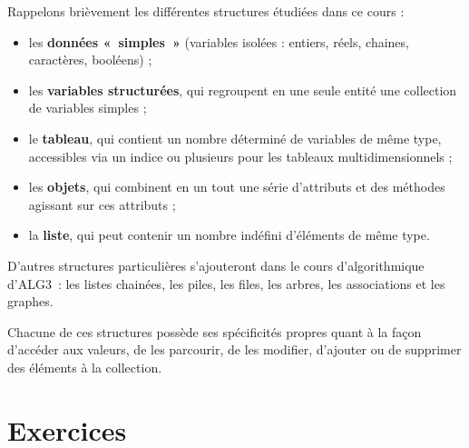 	Rappelons brièvement les différentes structures étudiées dans ce cours
	 :
	
	\begin{itemize}
		\item 
			les \textbf{données «~simples~»} 
			(variables isolées : entiers, réels, chaines, caractères, booléens) ;
		\item 
			les \textbf{variables structurées}, 
			qui regroupent en une seule entité
			une collection de variables simples ;
		\item 
			le \textbf{tableau}, 
			qui contient un nombre déterminé de variables de même type, 
			accessibles via un indice 
			ou plusieurs pour les tableaux multidimensionnels ;
		\item 
			les \textbf{objets}, 
			qui combinent en un tout une série d’attributs 
			et des méthodes agissant sur ces attributs ;
		\item 
			la \textbf{liste}, 
			qui peut contenir un nombre indéfini d’éléments de même type.
	\end{itemize}
	
	D’autres structures particulières s’ajouteront 
	dans le cours d'algorithmique d'ALG3~: 
	les listes chainées, les piles, les files, les arbres, les associations et les graphes.
	
	Chacune de ces structures possède ses spécificités propres quant à la
	façon d’accéder aux valeurs, de les parcourir, de les modifier,
	d’ajouter ou de supprimer des éléments à la collection. 

\section{Exercices}

